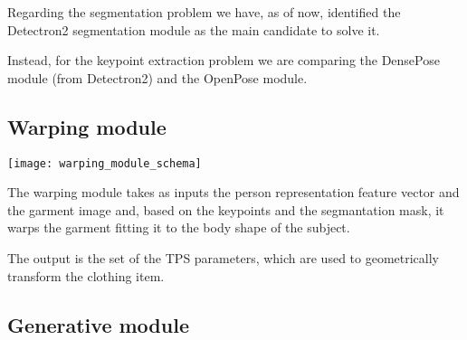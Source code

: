 \begin{multicols}{2}
Regarding the segmentation problem we have, as of now, identified the Detectron2 segmentation module as the main candidate to solve it.

Instead, for the keypoint extraction problem we are comparing the DensePose module (from Detectron2) and the OpenPose module.




\subsection{Warping module}
\texttt{[image: warping\_module\_schema]}

The warping module takes as inputs the person representation feature vector and the garment image and, based on the keypoints and the segmantation mask, it warps the garment fitting it to the body shape of the subject.

The output is the set of the TPS parameters, which are used to geometrically transform the clothing item.



\subsection{Generative module}





\end{multicols}